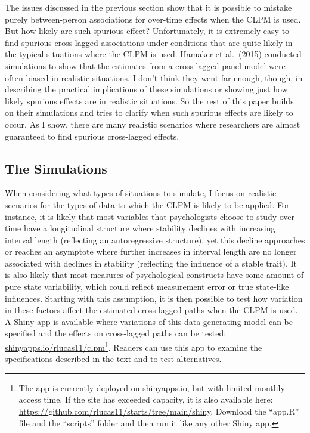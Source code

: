 \documentclass[
  english,
  man,floatsintext]{apa6}
\begin{document}
The issues discussed in the previous section show that it is possible to mistake purely between-person associations for over-time effects when the CLPM is used. But how likely are such spurious effect? Unfortunately, it is extremely easy to find spurious cross-lagged associations under conditions that are quite likely in the typical situations where the CLPM is used. Hamaker et al.~(2015) conducted simulations to show that the estimates from a cross-lagged panel model were often biased in realistic situations. I don't think they went far enough, though, in describing the practical implications of these simulations or showing just how likely spurious effects are in realistic situations. So the rest of this paper builds on their simulations and tries to clarify when such spurious effects are likely to occur. As I show, there are many realistic scenarios where researchers are almost guaranteed to find spurious cross-lagged effects.

\hypertarget{the-simulations}{%
\subsection{The Simulations}\label{the-simulations}}

When considering what types of situations to simulate, I focus on realistic scenarios for the types of data to which the CLPM is likely to be applied. For instance, it is likely that most variables that psychologists choose to study over time have a longitudinal structure where stability declines with increasing interval length (reflecting an autoregressive structure), yet this decline approaches or reaches an asymptote where further increases in interval length are no longer associated with declines in stability (reflecting the influence of a stable trait). It is also likely that most measures of psychological constructs have some amount of pure state variability, which could reflect measurement error or true state-like influences. Starting with this assumption, it is then possible to test how variation in these factors affect the estimated cross-lagged paths when the CLPM is used. A Shiny app is available where variations of this data-generating model can be specified and the effects on cross-lagged paths can be tested: \href{https://shinyapps.io/rlucas11/clpm}{shinyapps.io/rlucas11/clpm}\footnote{The app is currently deployed on shinyapps.io, but with limited monthly access time. If the site has exceeded capacity, it is also available here: \url{https://github.com/rlucas11/starts/tree/main/shiny}. Download the ``app.R'' file and the ``scripts'' folder and then run it like any other Shiny app.}. Readers can use this app to examine the specifications described in the text and to test alternatives.
\end{document}
